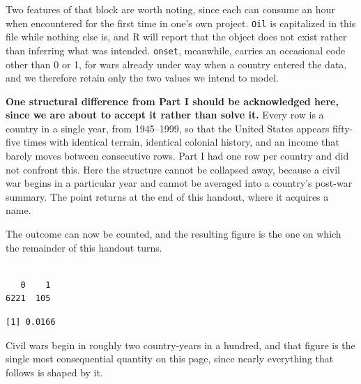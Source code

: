 \documentclass[
  a4paper,
]{scrbook}
\newenvironment{Shaded}{\begin{snugshade}}{\end{snugshade}}
\newcommand{\DecValTok}[1]{\textcolor[rgb]{0.68,0.00,0.00}{#1}}
\newcommand{\FunctionTok}[1]{\textcolor[rgb]{0.28,0.35,0.67}{#1}}
\newcommand{\NormalTok}[1]{\textcolor[rgb]{0.00,0.23,0.31}{#1}}
\newcommand{\SpecialCharTok}[1]{\textcolor[rgb]{0.37,0.37,0.37}{#1}}
\begin{document}
Two features of that block are worth noting, since each can consume an
hour when encountered for the first time in one's own project.
\texttt{Oil} is capitalized in this file while nothing else is, and R
will report that the object does not exist rather than inferring what
was intended. \texttt{onset}, meanwhile, carries an occasional code
other than 0 or 1, for wars already under way when a country entered the
data, and we therefore retain only the two values we intend to model.

\textbf{One structural difference from Part I should be acknowledged
here, since we are about to accept it rather than solve it.} Every row
is a country in a single year, from 1945--1999, so that the United
States appears fifty-five times with identical terrain, identical
colonial history, and an income that barely moves between consecutive
rows. Part I had one row per country and did not confront this. Here the
structure cannot be collapsed away, because a civil war begins in a
particular year and cannot be averaged into a country's post-war
summary. The point returns at the end of this handout, where it acquires
a name.

The outcome can now be counted, and the resulting figure is the one on
which the remainder of this handout turns.

\begin{Shaded}
\end{Shaded}

\begin{verbatim}

   0    1 
6221  105 
\end{verbatim}

\begin{Shaded}
\end{Shaded}

\begin{verbatim}
[1] 0.0166
\end{verbatim}

Civil wars begin in roughly two country-years in a hundred, and that
figure is the single most consequential quantity on this page, since
nearly everything that follows is shaped by it.
\end{document}
